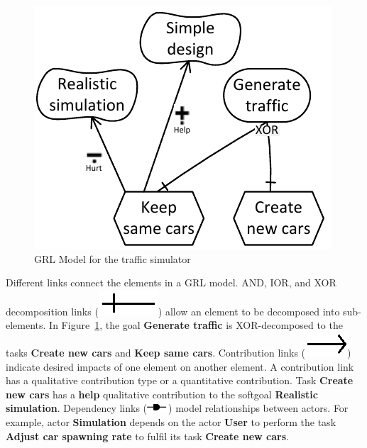 \begin{figure}[ht]
\centering
\includegraphics[]{img/Example}
\caption{GRL Model for the traffic simulator}
\label{fig:trafficsim}
\end{figure}

Different links connect the elements in a GRL model. AND, IOR, and XOR decomposition links (\includegraphics[scale=1]{img/decomposition}) allow an element to be decomposed into sub-elements. In Figure~\ref{fig:trafficsim}, the goal \textbf{Generate traffic} is XOR-decomposed to the tasks \textbf{Create new cars} and \textbf{Keep same cars}. Contribution links (\includegraphics[scale=1]{img/contribution}) indicate desired impacts of one element on another element. A contribution link has a qualitative contribution type or a quantitative contribution. Task \textbf{Create new cars} has a \textbf{help} qualitative contribution to the softgoal \textbf{Realistic simulation}. Dependency links (\includegraphics[scale=1]{img/dependency}) model relationships between actors. For example, actor \textbf{Simulation} depends on the actor \textbf{User} to perform the task \textbf{Adjust car spawning rate} to fulfil its task \textbf{Create new cars}.

